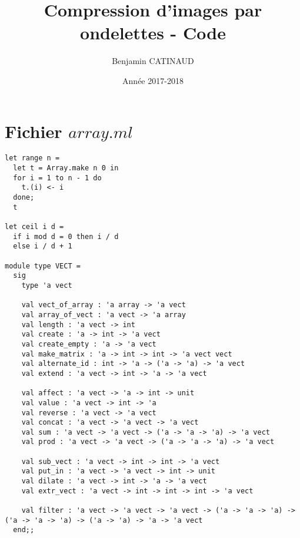 \documentclass[a4paper,10pt]{report}
\title{Compression d'images par ondelettes - Code}
\author{Benjamin CATINAUD}
\date{Ann\'{e}e 2017-2018}
\theoremstyle{break}
\begin{document}
\maketitle

  \section*{Fichier $array.ml$}
  
    \begin{lstlisting}
let range n =
  let t = Array.make n 0 in
  for i = 1 to n - 1 do
    t.(i) <- i
  done;
  t

let ceil i d =
  if i mod d = 0 then i / d
  else i / d + 1

module type VECT =
  sig
    type 'a vect

    val vect_of_array : 'a array -> 'a vect
    val array_of_vect : 'a vect -> 'a array
    val length : 'a vect -> int
    val create : 'a -> int -> 'a vect
    val create_empty : 'a -> 'a vect
    val make_matrix : 'a -> int -> int -> 'a vect vect
    val alternate_id : int -> 'a -> ('a -> 'a) -> 'a vect
    val extend : 'a vect -> int -> 'a -> 'a vect

    val affect : 'a vect -> 'a -> int -> unit
    val value : 'a vect -> int -> 'a
    val reverse : 'a vect -> 'a vect
    val concat : 'a vect -> 'a vect -> 'a vect
    val sum : 'a vect -> 'a vect -> ('a -> 'a -> 'a) -> 'a vect
    val prod : 'a vect -> 'a vect -> ('a -> 'a -> 'a) -> 'a vect

    val sub_vect : 'a vect -> int -> int -> 'a vect
    val put_in : 'a vect -> 'a vect -> int -> unit
    val dilate : 'a vect -> int -> 'a -> 'a vect
    val extr_vect : 'a vect -> int -> int -> int -> 'a vect

    val filter : 'a vect -> 'a vect -> 'a vect -> ('a -> 'a -> 'a) -> ('a -> 'a -> 'a) -> ('a -> 'a) -> 'a -> 'a vect
  end;;
	
    \end{lstlisting}
\newpage
\end{document}
